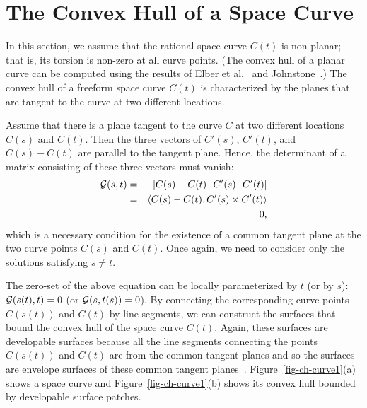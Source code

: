 \documentclass[doublespacing]{elsart}
\begin{document}
\section{The Convex Hull of a Space Curve}
\label{sec-space-curve}

In this section, we assume that the rational space curve $C(t)$ is
non-planar; that is, its torsion is non-zero at all curve points.
(The convex hull of a planar curve can be computed using the results
of Elber et al.~\cite{Elber2001b} and Johnstone~\cite{Johnstone2001}.)
The convex hull of a freeform space curve $C(t)$ is characterized
by the planes that are tangent to the curve at two different locations.

Assume that there is a plane tangent to the curve $C$ at two different
locations $C(s)$ and $C(t)$.  Then the three vectors of
$C'(s)$, $C'(t)$, and $C(s)-C(t)$ are parallel to the tangent plane.
Hence, the determinant of a matrix consisting of these three vectors 
must vanish:
\begin{eqnarray*}
{\cal G}(s,t) &=& |C(s)-C(t)\ \ C'(s)\ \ C'(t)|\\
&=& \inner{C(s)-C(t)}{C'(s) \times C'(t)}\\
&=& 0,
\end{eqnarray*}
which is a necessary condition for the existence of
a common tangent plane at the two curve points $C(s)$ and $C(t)$.
Once again, we need to consider only the solutions satisfying $s \neq t$.

The zero-set of the above equation can be locally parameterized 
by $t$ (or by $s$): ${\cal G}(s(t),t) = 0$
(or ${\cal G}(s,t(s)) = 0$).
By connecting the corresponding curve points $C(s(t))$ and $C(t)$
by line segments, we can construct the surfaces
that bound the convex hull of the space curve $C(t)$. Again, these
surfaces are developable surfaces because all the line segments 
connecting the points $C(s(t))$ and $C(t)$ are from the common 
tangent planes and so the surfaces are envelope surfaces of these
common tangent planes~\cite{Pottmann}.
Figure~\ref{fig-ch-curve1}(a) shows a space curve and
Figure~\ref{fig-ch-curve1}(b) shows its convex hull bounded by
developable surface patches.
\end{document}
